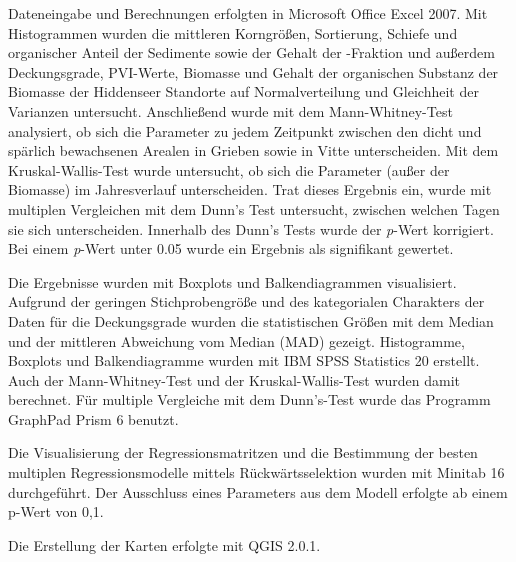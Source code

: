 Dateneingabe und Berechnungen erfolgten in Microsoft Office Excel 2007. Mit Histogrammen wurden die mittleren Korngrößen, Sortierung, Schiefe und organischer Anteil der Sedimente sowie der Gehalt der -Fraktion und außerdem Deckungsgrade, PVI-Werte, Biomasse und Gehalt der organischen Substanz der Biomasse der Hiddenseer Standorte auf Normalverteilung und Gleichheit der Varianzen untersucht. Anschließend wurde mit dem Mann-Whitney-Test analysiert, ob sich die Parameter zu jedem Zeitpunkt zwischen den dicht und spärlich bewachsenen Arealen in Grieben sowie in Vitte unterscheiden. Mit dem Kruskal-Wallis-Test wurde untersucht, ob sich die Parameter (außer der Biomasse) im Jahresverlauf unterscheiden. Trat dieses Ergebnis ein, wurde mit multiplen Vergleichen mit dem Dunn's Test untersucht, zwischen welchen Tagen sie sich unterscheiden. Innerhalb des Dunn's Tests wurde der \textit{p}-Wert korrigiert. Bei einem \textit{p}-Wert unter 0.05 wurde ein Ergebnis als signifikant gewertet.

Die Ergebnisse wurden mit Boxplots und Balkendiagrammen visualisiert. Aufgrund der geringen Stichprobengröße und des kategorialen Charakters der Daten für die Deckungsgrade wurden die statistischen Größen mit dem Median und der mittleren Abweichung vom Median (MAD) gezeigt. Histogramme, Boxplots und Balkendiagramme wurden mit IBM SPSS Statistics 20 erstellt. Auch der Mann-Whitney-Test und der Kruskal-Wallis-Test wurden damit berechnet. Für multiple Vergleiche mit dem Dunn's-Test wurde das Programm GraphPad Prism 6 benutzt. 

Die Visualisierung der Regressionsmatritzen und die Bestimmung der besten multiplen Regressionsmodelle mittels Rückwärtsselektion wurden mit Minitab 16 durchgeführt. Der Ausschluss eines Parameters aus dem Modell erfolgte ab einem p-Wert von 0,1. 

Die Erstellung der Karten erfolgte mit QGIS 2.0.1. 

